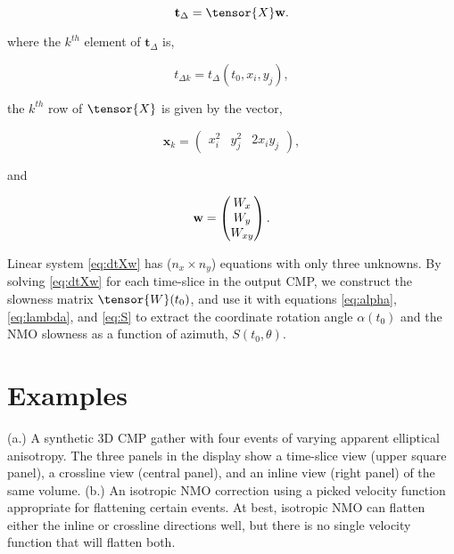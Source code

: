 \begin{equation}
\label{eq:dtXw}
\mathbf{t}_\Delta=\tensor{X}\mathbf{w}.
\end{equation}

\noindent where the $k^{th}$ element of $\mathbf{t}_\Delta $ is,

\begin{equation}
\label{eq:Delta}
t_{\Delta k}=t_\Delta (t_0,x_i,y_j), 
\end{equation}

\noindent the $k^{th}$ row of $\tensor{X}$ is given by the vector,

\begin{equation}
\label{eq:x}
\mathbf{x}_{k}=\begin{pmatrix} x^2_i & y^2_j & 2x_iy_j \end{pmatrix},
\end{equation}

\noindent and

\begin{equation}
\label{eq:w}
\mathbf{w}=\begin{pmatrix} W_x \cr W_y \cr W_{xy} \end{pmatrix}.
\end{equation}

\noindent Linear system \ref{eq:dtXw} has ($n_x\times n_y$) equations with only three unknowns. By solving \ref{eq:dtXw} for each time-slice in the output CMP, we construct the slowness matrix $\tensor{W}(t_0)$, and use it with equations \ref{eq:alpha}, \ref{eq:lambda}, and \ref{eq:S} to extract the coordinate rotation angle $\alpha (t_0)$ and the NMO slowness as a function of azimuth, $S(t_0,\theta )$.

\section{Examples}

 {(a.) A synthetic 3D CMP gather with four events of varying apparent elliptical anisotropy. The three panels in the display show a time-slice view (upper square panel), a crossline view (central panel), and an inline view (right panel) of the same volume.  (b.) An isotropic NMO correction using a picked velocity function appropriate for flattening certain events.  At best, isotropic NMO can flatten either the inline or crossline directions well, but there is no single velocity function that will flatten both. }

